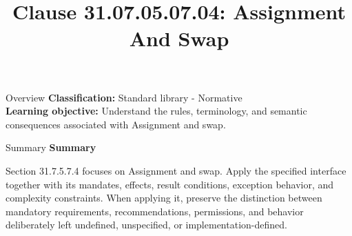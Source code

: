 \documentclass[10pt,letterpaper]{article}
\title{Clause 31.07.05.07.04: Assignment And Swap}
\author{}
\date{}
\begin{document}
\maketitle
\begin{CornellOverviewBox}{Overview}
\textbf{Classification:} Standard library - Normative\\[2pt]
\textbf{Learning objective:} Understand the rules, terminology, and semantic consequences associated with Assignment and swap.
\end{CornellOverviewBox}\begin{CornellSummaryBox}{Summary}
{\sffamily\bfseries\color{Accent} Summary}\par\vspace{3pt}Section 31.7.5.7.4 focuses on Assignment and swap. Apply the specified interface together with its mandates, effects, result conditions, exception behavior, and complexity constraints. When applying it, preserve the distinction between mandatory requirements, recommendations, permissions, and behavior deliberately left undefined, unspecified, or implementation-defined.
\end{CornellSummaryBox}
\end{document}
